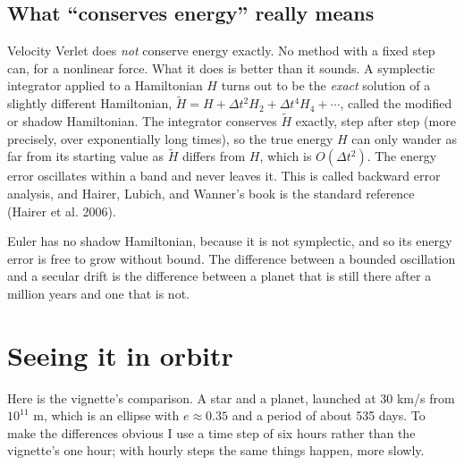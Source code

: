 \documentclass[
  10.5pt,
  letterpaper,
]{scrbook}
\theoremstyle{definition}
\theoremstyle{plain}
\theoremstyle{remark}
\begin{document}
\subsection{What ``conserves energy'' really
means}\label{what-conserves-energy-really-means}

Velocity Verlet does \emph{not} conserve energy exactly. No method with
a fixed step can, for a nonlinear force. What it does is better than it
sounds. A symplectic integrator applied to a Hamiltonian \(H\) turns out
to be the \emph{exact} solution of a slightly different Hamiltonian,
\(\tilde H = H + \Delta t^2 H_2 + \Delta t^4 H_4 + \cdots\), called the
modified or shadow Hamiltonian. The integrator conserves \(\tilde H\)
exactly, step after step (more precisely, over exponentially long
times), so the true energy \(H\) can only wander as far from its
starting value as \(\tilde H\) differs from \(H\), which is
\(O(\Delta t^2)\). The energy error oscillates within a band and never
leaves it. This is called backward error analysis, and Hairer, Lubich,
and Wanner's book is the standard reference (Hairer et al. 2006).

Euler has no shadow Hamiltonian, because it is not symplectic, and so
its energy error is free to grow without bound. The difference between a
bounded oscillation and a secular drift is the difference between a
planet that is still there after a million years and one that is not.

\section{Seeing it in orbitr}\label{seeing-it-in-orbitr}

Here is the vignette's comparison. A star and a planet, launched at 30
km/s from \(10^{11}\) m, which is an ellipse with \(e \approx 0.35\) and
a period of about 535 days. To make the differences obvious I use a time
step of six hours rather than the vignette's one hour; with hourly steps
the same things happen, more slowly.
\end{document}
